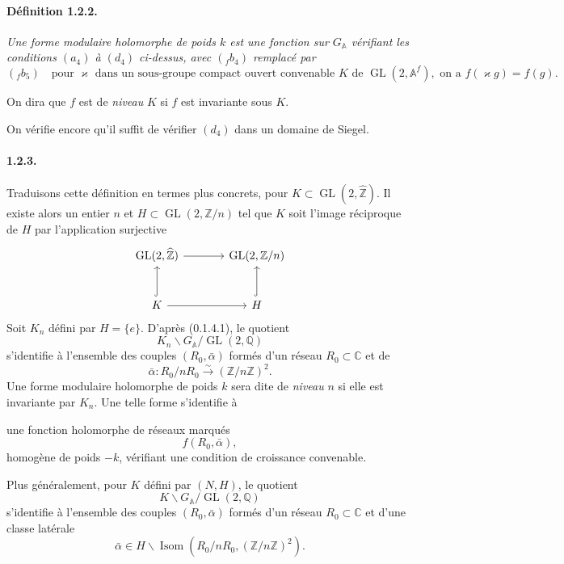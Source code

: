 \documentclass[10pt,a4paper]{article}
\providecommand{\GL}{\operatorname{GL}}
\providecommand{\Isom}{\operatorname{Isom}}
\providecommand{\Q}{\mathbb Q}
\providecommand{\Z}{\mathbb Z}
\providecommand{\C}{\mathbb C}
\providecommand{\Af}{\mathbb A^f}
\providecommand{\GA}{G_{\mathbb A}}
\providecommand{\iso}{\xrightarrow{\sim}}
\begin{document}
\paragraph{Définition 1.2.2.}{\itshape  Une forme modulaire holomorphe de poids $k$ est une fonction sur $\GA$ vérifiant les conditions $(a_4)$ à $(d_4)$ ci-dessus, avec $({}_{f}b_4)$ remplacé par
\[
({}_{f}b_5)\quad \text{pour }\varkappa\text{ dans un sous-groupe compact ouvert convenable }K\text{ de }\GL(2,\Af),\text{ on a } f(\varkappa g)=f(g).
\]
\par}
On dira que $f$ est de \emph{niveau} $K$ si $f$ est invariante sous $K$.

On vérifie encore qu'il suffit de vérifier $(d_4)$ dans un domaine de Siegel.

\paragraph{1.2.3.} Traduisons cette définition en termes plus concrets, pour $K\subset\GL(2,\widehat{\Z})$. Il existe alors un entier $n$ et $H\subset\GL(2,\Z/n)$ tel que $K$ soit l'image réciproque de $H$ par l'application surjective
\[
\begin{tikzcd}[row sep=large,column sep=large]
\GL(2,\widehat{\Z}) \arrow[r] & \GL(2,\Z/n)\\
K \arrow[u,hook] \arrow[r] & H \arrow[u,hook]
\end{tikzcd}
\]
Soit $K_n$ défini par $H=\{e\}$. D'après (0.1.4.1), le quotient
\[
K_n\backslash\GA/\GL(2,\Q)
\]
s'identifie à l'ensemble des couples $(R_0,\bar\alpha)$ formés d'un réseau $R_0\subset\C$ et de
\[
\bar\alpha:R_0/nR_0\iso(\Z/n\Z)^2.
\]
Une forme modulaire holomorphe de poids $k$ sera dite de \emph{niveau} $n$ si elle est invariante par $K_n$. Une telle forme s'identifie à

\clearpage
{}
\hypertarget{authority-17}{}
une fonction holomorphe de réseaux marqués
\[
f(R_0,\bar\alpha),
\]
homogène de poids $-k$, vérifiant une condition de croissance convenable.

Plus généralement, pour $K$ défini par $(N,H)$, le quotient
\[
K\backslash\GA/\GL(2,\Q)
\]
s'identifie à l'ensemble des couples $(R_0,\bar\alpha)$ formés d'un réseau $R_0\subset\C$ et d'une classe latérale
\[
\bar\alpha\in H\backslash\Isom(R_0/nR_0,(\Z/n\Z)^2).
\]
\end{document}
